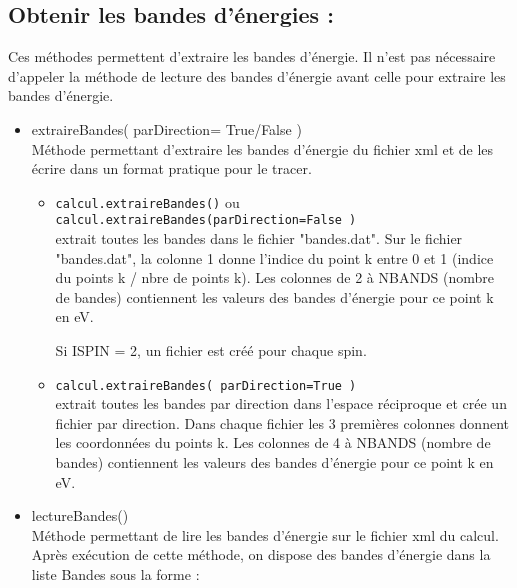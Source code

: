\documentclass[10pt,a4paper,fleqn]{article}
\begin{document}
\subsection{Obtenir les bandes d'énergies :}

Ces méthodes permettent d'extraire les bandes d'énergie. Il n'est pas nécessaire d'appeler la
méthode de lecture des bandes d'énergie avant celle pour extraire les bandes d'énergie.

\begin{itemize}
	\item extraireBandes( parDirection= True/False ) \\
		
		Méthode permettant d'extraire les bandes d'énergie du fichier xml et de les
		écrire dans un format pratique pour le tracer. \\

		\begin{itemize}
			\item \verb!calcul.extraireBandes()! ou 
				\verb!calcul.extraireBandes(parDirection=False )!
				\\

				extrait toutes les bandes dans le fichier "bandes.dat". Sur le
				fichier "bandes.dat", la colonne 1 donne l'indice du point k entre 0
				et 1 (indice du points k / nbre de points k). Les colonnes de 2 à
				NBANDS (nombre de bandes) contiennent les valeurs des bandes
				d'énergie pour ce point k en eV.

				Si ISPIN = 2, un fichier est créé pour chaque spin. \\

			\item \verb!calcul.extraireBandes( parDirection=True )!  \\

				extrait toutes les bandes par direction dans l'espace réciproque et
				crée un fichier par direction. Dans chaque fichier les 3 premières
				colonnes donnent les coordonnées du points k. Les colonnes de 4 à
				NBANDS (nombre de bandes) contiennent les valeurs des bandes
				d'énergie pour ce point k en eV. \\
		\end{itemize}

	\item lectureBandes() \\

		Méthode permettant de lire les bandes d'énergie sur le fichier xml du calcul.
		Après exécution de cette méthode, on dispose des bandes d'énergie dans la liste
		Bandes sous la forme :
    

\end{itemize}
\end{document}
